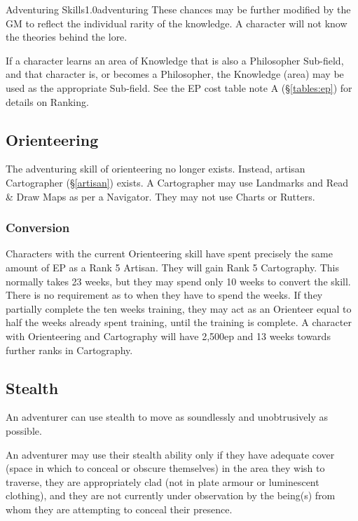 \begin{skill}{Adventuring Skills}{1.0}{adventuring}
These chances may be further modified by the GM to reflect the
individual rarity of the knowledge. A character will not know the
theories behind the lore.

If a character learns an area of Knowledge that is also a Philosopher
Sub-field, and that character is, or becomes a Philosopher, the
Knowledge (area) may be used as the appropriate Sub-field.  See the EP
cost table note A (\S\ref{tables:ep}) for details on Ranking.


\subsection{Orienteering}
\label{skills:orienteering}


The adventuring skill of orienteering no longer exists.  Instead,
artisan Cartographer (\S\ref{artisan}) exists.  A Cartographer may use
Landmarks and Read \& Draw Maps as per a Navigator. They may not use
Charts or Rutters.

\subsubsection{Conversion}

Characters with the current Orienteering skill have spent precisely
the same amount of EP as a Rank 5 Artisan. They will gain Rank 5
Cartography. This normally takes 23 weeks, but they may spend only 10
weeks to convert the skill. There is no requirement as to when they
have to spend the weeks. If they partially complete the ten weeks
training, they may act as an Orienteer equal to half the weeks already
spent training, until the training is complete. A character with
Orienteering and Cartography will have 2,500ep and 13 weeks towards
further ranks in Cartography.


\subsection{Stealth}
\label{stealth}

An adventurer can use stealth to move as soundlessly and unobtrusively
as possible.

An adventurer may use their stealth ability only if they have adequate
cover (\ie space in which to conceal or obscure themselves) in the
area they wish to traverse, they are appropriately clad (\eg not in
plate armour or luminescent clothing), and they are not currently
under observation by the being(s) from whom they are attempting to
conceal their presence.


\end{skill}
